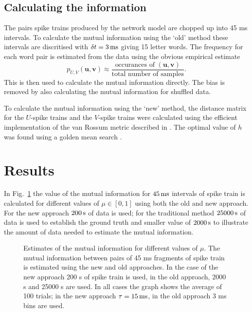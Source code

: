 \documentclass[12pt]{article}
\newcommand{\ms}{\mbox{\,ms}}
\newcommand{\s}{\mbox{\,s}}
\renewcommand{\u}{\mathbf{u}}
\renewcommand{\v}{\mathbf{v}}
\begin{document}
\subsection{Calculating the information}

The pairs spike trains produced by the network model are chopped up
into 45 ms intervals. To calculate the mutual information using the
\lq{}old\rq{} method these intervals are discritised with $\delta
t=3\ms$ giving 15 letter words. The frequency for each word pair is
estimated from the data using the obvious empirical estimate
\begin{equation}
p_{U,V}(\u,\v)\approx \frac{\mbox{occurances of }(\u,\v)}{\mbox{total number of samples}}.
\end{equation}
This is then used to calculate the mutual information directly. The
bias is removed by also calculating the mutual information for
shuffled data.

To calculate the mutual information using the \lq{}new\rq{} method,
the distance matrix for the $U$-spike trains and the $V$-spike trains
were calculated using the efficient implementation of the van Rossum
metric described in \citep{HoughtonKreuz2012}. The optimal value of $h$
was found using a golden mean search \citep{Kiefer1953}.

\section{Results}

In Fig.~\ref{fig_mu_sweep} the value of the mutual information for
$45\ms$ intervals of spike train is calculated for different values of
$\mu\in[0,1]$ using both the old and new approach. For the new
  approach $200\s$ of data is used; for the traditional method
  $25000\s$ of data is used to establish the ground truth and smaller
  value of $2000\s$ to illustrate the amount of data needed to
  estimate the mutual information.

\begin{figure}[tp]
\begin{center}

\end{center}
\caption{Estimates of the mutual information for different values of
  $\mu$. The mutual information between pairs of 45 ms fragments of
  spike train is estimated using the new and old approaches. In the
  case of the new approach 200 s of spike train is used, in the old
  approach, 2000 s and 25000 s are used. In all cases the graph shows
  the average of 100 trials; in the new approach $\tau=15\ms$, in the
  old approach 3 ms bins are used.\label{fig_mu_sweep}}
\end{figure}
\end{document}
